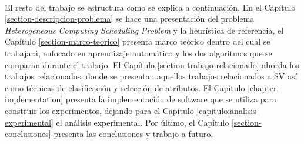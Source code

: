 \paragraph{} El resto del trabajo se estructura como se explica a continuación.
En el Capítulo \ref{section-descripcion-problema} se hace una presentación del problema \textit{Heterogeneous Computing Scheduling Problem} y la heurística de referencia, el Capítulo \ref{section-marco-teorico} presenta marco teórico dentro del cual se trabajará, enfocado en aprendizaje automático y los dos algoritmos que se comparan durante el trabajo.
El Capítulo \ref{section-trabajo-relacionado} aborda los trabajos relacionados, donde se presentan aquellos trabajos relacionados a SV así como técnicas de clasificación y selección de atributos.
El Capítulo \ref{chapter-implementation} presenta la implementación de software que se utiliza para construir los experimentos, dejando para el Capítulo \ref{capitulo:analisis-experimental} el análisis experimental.
Por último, el Capítulo \ref{section-conclusiones} presenta las conclusiones y trabajo a futuro.
